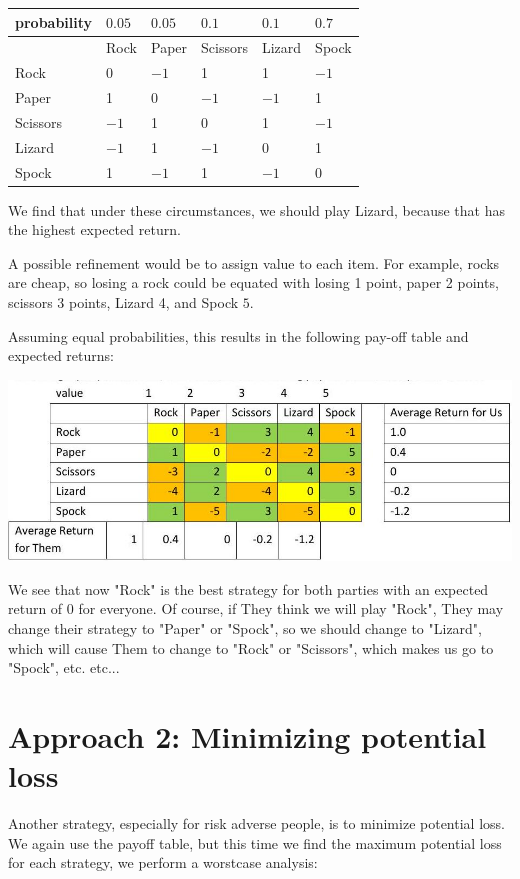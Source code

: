 \documentclass[10pt]{article}
\begin{document}
\begin{tabular}{|l|l|l|l|l|l|}
\hline
probability & $0.05$ & $0.05$ & $0.1$ & $0.1$ & $0.7$ \\
\hline
 & Rock & Paper & Scissors & Lizard & Spock \\
\hline
Rock & 0 & $-1$ & 1 & 1 & $-1$ \\
\hline
Paper & 1 & 0 & $-1$ & $-1$ & 1 \\
\hline
Scissors & $-1$ & 1 & 0 & 1 & $-1$ \\
\hline
Lizard & $-1$ & 1 & $-1$ & 0 & 1 \\
\hline
Spock & 1 & $-1$ & 1 & $-1$ & 0 \\
\hline
\end{tabular}

We find that under these circumstances, we should play Lizard, because that has the highest expected return.

A possible refinement would be to assign value to each item. For example, rocks are cheap, so losing a rock could be equated with losing 1 point, paper 2 points, scissors 3 points, Lizard 4, and Spock $5 .$

Assuming equal probabilities, this results in the following pay-off table and expected returns:

\includegraphics[max width=\textwidth]{2022_07_05_5945264bba2a5f6ba667g-67}

We see that now "Rock" is the best strategy for both parties with an expected return of 0 for everyone. Of course, if They think we will play "Rock", They may change their strategy to "Paper" or "Spock", so we should change to "Lizard", which will cause Them to change to "Rock" or "Scissors", which makes us go to "Spock", etc. etc...

\section{Approach 2: Minimizing potential loss}
Another strategy, especially for risk adverse people, is to minimize potential loss. We again use the payoff table, but this time we find the maximum potential loss for each strategy, we perform a worstcase analysis:
\end{document}

